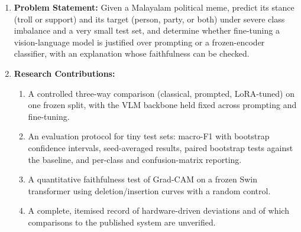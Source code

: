 \begin{enumerate}
    \item \textbf{Problem Statement:} Given a Malayalam political meme, predict its stance (troll or support) and its target (person, party, or both) under severe class imbalance and a very small test set, and determine whether fine-tuning a vision-language model is justified over prompting or a frozen-encoder classifier, with an explanation whose faithfulness can be checked.
    \item \textbf{Research Contributions:}
    \begin{enumerate}
        \item A controlled three-way comparison (classical, prompted, LoRA-tuned) on one frozen split, with the VLM backbone held fixed across prompting and fine-tuning.
        \item An evaluation protocol for tiny test sets: macro-F1 with bootstrap confidence intervals, seed-averaged results, paired bootstrap tests against the baseline, and per-class and confusion-matrix reporting.
        \item A quantitative faithfulness test of Grad-CAM on a frozen Swin transformer using deletion/insertion curves with a random control.
        \item A complete, itemised record of hardware-driven deviations and of which comparisons to the published system are unverified.
    \end{enumerate}
\end{enumerate}
